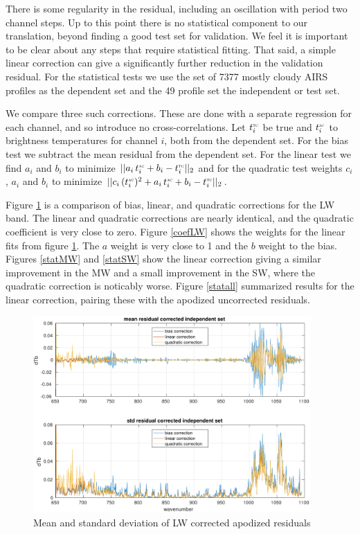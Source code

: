 \documentclass[11pt]{article}
\begin{document}
There is some regularity in the residual, including an oscillation
with period two channel steps.  Up to this point there is no
statistical component to our translation, beyond finding a good test
set for validation.  We feel it is important to be clear about any
steps that require statistical fitting.  That said, a simple linear
correction can give a significantly further reduction in the
validation residual.  For the statistical tests we use the set of
7377 mostly cloudy AIRS profiles as the dependent set and the 49
profile set the independent or test set.

We compare three such corrections.  These are done with a separate
regression for each {\cris} channel, and so introduce no
cross-correlations.  Let $t^{\mbox{\tiny\textsc{tc}}}_i$ be true {\cris} and $t^{\mbox{\tiny\textsc{ac}}}_i$
{\airs} to {\cris} brightness temperatures for {\cris} channel $i$,
both from the dependent set.  For the bias test we subtract the mean
residual from the dependent set.  For the linear test we find $a_i$
and $b_i$ to minimize $||a_i\,t^{\mbox{\tiny\textsc{ac}}}_i + b_i - t^{\mbox{\tiny\textsc{tc}}}_i||_2$ and for the
quadratic test weights $c_i$, $a_i$ and $b_i$ to minimize
$||c_i\,(t^{\mbox{\tiny\textsc{ac}}}_i)^2 + a_i\,t^{\mbox{\tiny\textsc{ac}}}_i + b_i - t^{\mbox{\tiny\textsc{tc}}}_i||_2$.

Figure \ref{statLW} is a comparison of bias, linear, and quadratic
corrections for the LW band.  The linear and quadratic corrections
are nearly identical, and the quadratic coefficient is very close 
to zero.  Figure \ref{coefLW} shows the weights for the linear fits
from figure \ref{statLW}.  The $a$ weight is very close to 1 and the
$b$ weight to the bias.  Figures \ref{statMW} and \ref{statSW} show
the linear correction giving a similar improvement in the MW and a
small improvement in the SW, where the quadratic correction is
noticably worse.  Figure \ref{statall} summarized results for the
linear correction, pairing these with the apodized uncorrected
residuals.


\begin{figure} %
  \centering
  \includegraphics[height=7.5cm]{figures/a2cris_regr_LW.pdf}
  \caption{Mean and standard deviation of LW corrected apodized
    residuals}
  \label{statLW}
\end{figure}
\end{document}

